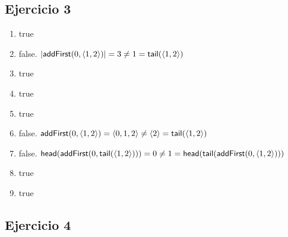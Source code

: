 \subsection{Ejercicio 3}
\begin{enumerate}[label=(\alph*)]
    \item true
    \item false. $|\mathsf{addFirst}(0, \langle 1,2 \rangle)| = 3 \neq 1 = \mathsf{tail}(\langle 1,2 \rangle)$
    \item true
    \item true
    \item true
    \item false. $\mathsf{addFirst}(0, \langle 1,2 \rangle) = \langle 0,1,2 \rangle \neq \langle 2 \rangle = \mathsf{tail}(\langle 1,2 \rangle)$
    \item false. $\mathsf{head}(\mathsf{addFirst}(0,\mathsf{tail}(\langle 1,2 \rangle))) = 0 \neq 1 = \mathsf{head}(\mathsf{tail}(\mathsf{addFirst}(0, \langle 1,2 \rangle)))$
    \item true
    \item true
\end{enumerate}

\subsection{Ejercicio 4}


